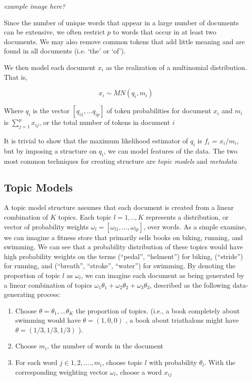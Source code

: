 \documentclass[]{article}
\begin{document}
\emph{example image here?}

Since the number of unique words that appear in a large number of
documents can be extensive, we often restrict $p$ to words that occur in
at least two documents. We may also remove common tokens that add little
meaning and are found in all documents (i.e. `the' or `of').

We then model each document $x_i$ as the realization of a multinomial
distribution. That is,

\[ x_{i} \sim MN(q_i,m_i) \]

Where $q_i$ is the vector $[q_{i1}, \dots q_{ip}]$ of token
probabilities for document $x_i$ and $m_i$ is
$\sum_{j = 1}^{p}{x_{ij}}$, or the total number of tokens in document
$i$

It is trivial to show that the maximum likelihood estimator of $q_i$ is
$f_i$ = $x_i / m_i$, but by imposing a structure on $q_i$, we can model
features of the data. The two most common techniques for creating
structure are \emph{topic models} and \emph{metadata}

\subsection{Topic Models}\label{topic-models}

A topic model structure assumes that each document is created from a
linear combination of $K$ topics. Each topic $l = 1,..,K$ represents a
distribution, or vector of probability weights
$\omega_l = [\omega_{l1}, ... , \omega_{lp}]$, over words. As a simple
examine, we can imagine a fitness store that primarily sells books on
biking, running, and swimming. We can see that a probability
distribution of these topics would have high probability weights on the
terms (``pedal'', ``helment'') for biking, (``stride'') for running, and
(``breath'', ``stroke'', ``water'') for swimming. By denoting the
proportion of topic $l$ as $\omega_l$, we can imagine each document as
being generated by a linear combination of topics
$\omega_1 \theta_1 + \omega_2 \theta_2 + \omega_3 \theta_3$, described
as the following data-generating process:

\begin{enumerate}
\def\labelenumi{\arabic{enumi}.}
\itemsep1pt\parskip0pt
\item
  Choose $\theta = \theta_1,...\theta_K$ the proportion of topics.
  (i.e., a book completely about swimming would have $\theta=(1,0,0)$ ,
  a book about triathalons might have $\theta =(1/3,1/3,1/3)$ ).
\item
  Choose $m_i$, the number of words in the document
\item
  For each word $j \in 1,2,....,m_i$, choose topic $l$ with probability
  $\theta_l$. With the corresponding weighting vector $\omega_l$, choose
  a word $x_{ij}$
\end{enumerate}
\end{document}
